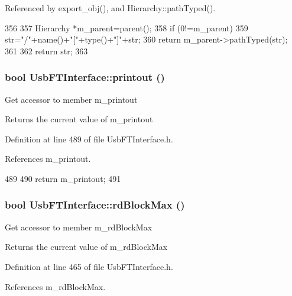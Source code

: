 Referenced by export\_\-obj(), and Hierarchy::pathTyped().


\begin{DoxyCode}
356                                            {
357   Hierarchy *m_parent=parent();
358   if (0!=m_parent){
359     str="/"+name()+"["+type()+"]"+str;
360     return m_parent->pathTyped(str);
361   }
362   return str;
363 }
\end{DoxyCode}
\hypertarget{classUsbFTInterface_ad312ac511dfb57c513f2998de396ba9b}{
\subsubsection[{printout}]{\setlength{\rightskip}{0pt plus 5cm}bool UsbFTInterface::printout ()}}
\label{classUsbFTInterface_ad312ac511dfb57c513f2998de396ba9b}
Get accessor to member m\_\-printout \begin{DoxyReturn}{Returns}
the current value of m\_\-printout 
\end{DoxyReturn}


Definition at line 489 of file UsbFTInterface.h.

References m\_\-printout.


\begin{DoxyCode}
489                    {
490     return m_printout;
491   }
\end{DoxyCode}
\hypertarget{classUsbFTInterface_a9f213ab1804e61af476bbdd3ade2d053}{
\subsubsection[{rdBlockMax}]{\setlength{\rightskip}{0pt plus 5cm}bool UsbFTInterface::rdBlockMax ()}}
\label{classUsbFTInterface_a9f213ab1804e61af476bbdd3ade2d053}
Get accessor to member m\_\-rdBlockMax \begin{DoxyReturn}{Returns}
the current value of m\_\-rdBlockMax 
\end{DoxyReturn}


Definition at line 465 of file UsbFTInterface.h.

References m\_\-rdBlockMax.



